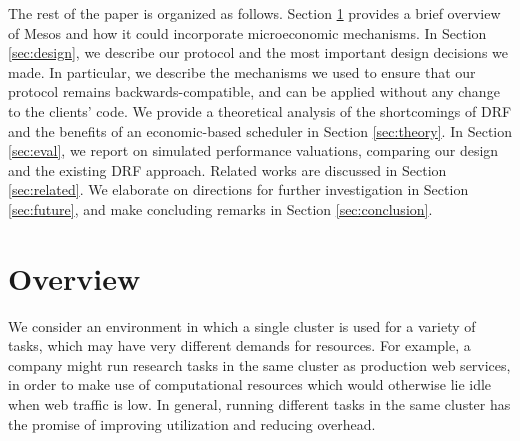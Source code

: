 \documentclass{acm_proc_article-sp}
\begin{document}
The rest of the paper is organized as follows.
Section \ref{sec:overview} provides a brief overview of Mesos and how it
could incorporate microeconomic mechanisms.
%
%
In Section \ref{sec:design}, we describe our protocol and the most important design decisions
we made. In particular, we describe the mechanisms we used to ensure that our
protocol remains backwards-compatible, and can be applied without any change to
the clients' code.
%
We provide a theoretical analysis of the shortcomings of DRF and the benefits of an economic-based scheduler in Section \ref{sec:theory}.
%
In Section \ref{sec:eval}, we report on simulated performance valuations, comparing our
design and the existing DRF approach.
Related works are discussed in Section \ref{sec:related}.
We elaborate on directions for further investigation in Section \ref{sec:future}, and make concluding remarks in Section \ref{sec:conclusion}.



\section{Overview}
\label{sec:overview}

We consider an environment in which a single cluster is used for a variety of
tasks, which may have very different demands for resources. For example, a
company might run research tasks in the same cluster as production web services,
in order to make use of computational resources which would otherwise lie idle
when web traffic is low. In general, running different tasks in the same cluster
has the promise of improving utilization and reducing overhead. 
\end{document}
